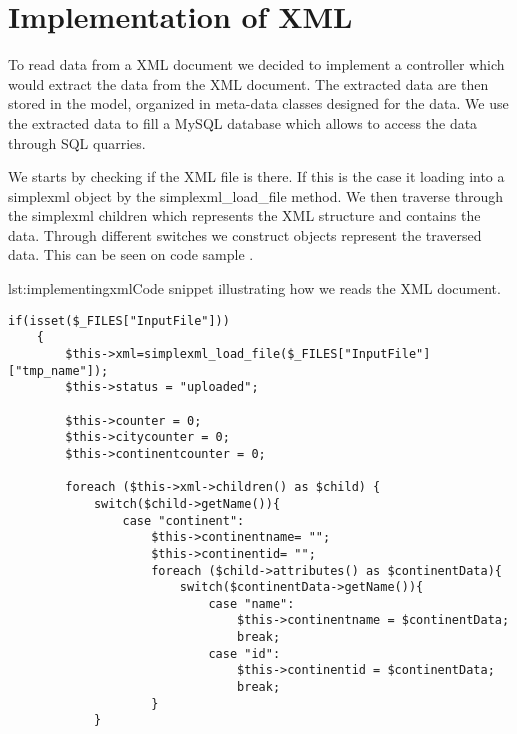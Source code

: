 \section{Implementation of XML}
To read data from a XML document we decided to implement a controller which would extract the data from the XML document. The extracted data are then stored in the model, organized in meta-data classes designed for the data. We use the extracted data to fill a MySQL database which allows to access the data through SQL quarries.

We starts by checking if the XML file is there. If this is the case it loading into a simplexml object by the simplexml\_load\_file method. We then traverse through the simplexml children which represents the XML structure and contains the data. Through different switches we construct objects represent the traversed data. This can be seen on code sample .

\begin{code}{lst:implementingxml}{Code snippet illustrating how we reads the XML document.}
\begin{lstlisting}
if(isset($_FILES["InputFile"]))
	{
    	$this->xml=simplexml_load_file($_FILES["InputFile"]["tmp_name"]);
        $this->status = "uploaded";

	    $this->counter = 0;
	    $this->citycounter = 0;
	    $this->continentcounter = 0;

	    foreach ($this->xml->children() as $child) {
	    	switch($child->getName()){
	   			case "continent":
	  				$this->continentname= "";
	    			$this->continentid= "";
	    			foreach ($child->attributes() as $continentData){
	    				switch($continentData->getName()){
	    					case "name":
	    						$this->continentname = $continentData;
	    						break;
    						case "id":
	    						$this->continentid = $continentData;
	    						break;
					}
  			}
  			\end{lstlisting}
\end{code}